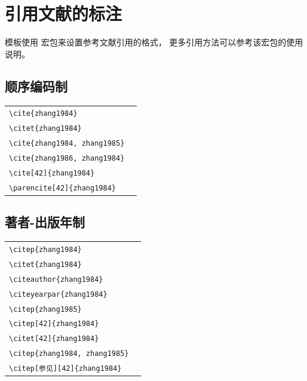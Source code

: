 
\chapter{引用文献的标注}

模板使用  宏包来设置参考文献引用的格式，
更多引用方法可以参考该宏包的使用说明。


\section{顺序编码制}

\noindent
\begin{tabular}{l@{\enskip$\Rightarrow$\enskip}l}
  \verb|\cite{zhang1984}|            & \cite{zhang1984}            \\
  \verb|\citet{zhang1984}|           & \citet{zhang1984}           \\
  \verb|\cite{zhang1984, zhang1985}| & \cite{zhang1984, zhang1985} \\
  \verb|\cite{zhang1986, zhang1984}| & \cite{zhang1986, zhang1984} \\
  \verb|\cite[42]{zhang1984}|        & \cite[42]{zhang1984}        \\
  \verb|\parencite[42]{zhang1984}|   & \parencite[42]{zhang1984}   \\
\end{tabular}


\section{著者-出版年制}

\noindent
\begin{tabular}{l@{\enskip$\Rightarrow$\enskip}l}
  \verb|\citep{zhang1984}|            & \citep{zhang1984}            \\
  \verb|\citet{zhang1984}|            & \citet{zhang1984}            \\
  \verb|\citeauthor{zhang1984}|       & \citeauthor{zhang1984}       \\
  \verb|\citeyearpar{zhang1984}|      & \citeyearpar{zhang1984}      \\
  \verb|\citep{zhang1985}|            & \citep{zhang1985}            \\
  \verb|\citep[42]{zhang1984}|        & \citep[42]{zhang1984}        \\
  \verb|\citet[42]{zhang1984}|        & \citet[42]{zhang1984}        \\
  \verb|\citep{zhang1984, zhang1985}| & \citep{zhang1984, zhang1985} \\
  \verb|\citep[参见][42]{zhang1984}|  & \citep[参见][42]{zhang1984}  \\
\end{tabular}


\nocite{*}
